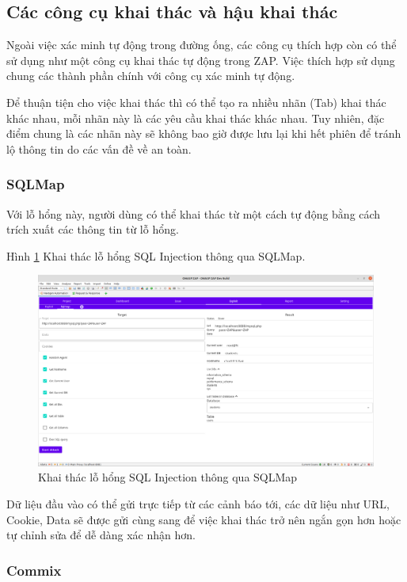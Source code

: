 \documentclass[./../main.tex]{subfiles}
\begin{document}
\subsection{Các công cụ khai thác và hậu khai thác}

Ngoài việc xác minh tự động trong đường ống, các công cụ thích hợp còn có thể sử dụng như một công cụ khai thác tự động trong ZAP. Việc thích hợp sử dụng chung các thành phần chính với công cụ xác minh tự động.

Để thuận tiện cho việc khai thác thì có thể tạo ra nhiều nhãn (Tab) khai thác khác nhau, mỗi nhãn này là các yêu cầu khai thác khác nhau. Tuy nhiên, đặc điểm chung là các nhãn này sẽ không bao giờ được lưu lại khi hết phiên để tránh lộ thông tin do các vấn đề về an toàn.
\subsubsection{SQLMap}
Với lỗ hổng này, người dùng có thể khai thác từ một cách tự động bằng cách trích xuất các thông tin từ lỗ hổng.

Hình \ref{fig:sqlmap_explot} Khai thác lỗ hổng SQL Injection thông qua SQLMap.

\begin{figure}[h!]
	\includegraphics[width=\linewidth]{./images/sqlmap_explot.png}
	\caption{Khai thác lỗ hổng SQL Injection thông qua SQLMap}
	\label{fig:sqlmap_explot}
\end{figure}
Dữ liệu đầu vào có thể gửi trực tiếp từ các cảnh báo tới, các dữ liệu như URL, Cookie, Data sẽ được gửi cùng sang để việc khai thác trở nên ngắn gọn hơn hoặc tự chỉnh sửa để dễ dàng xác nhận hơn.
\subsubsection{Commix}
\end{document}
